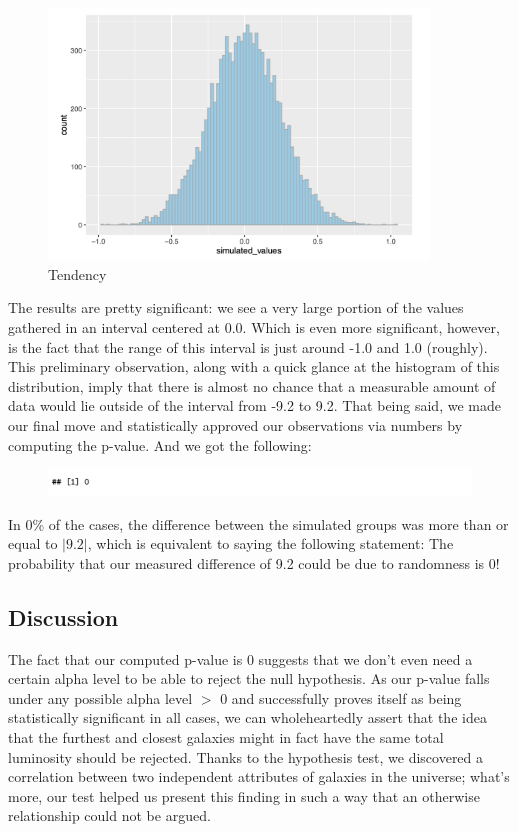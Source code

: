 \documentclass[12pt]{article}
\begin{document}
\begin{figure}[h]
	\centering
	\includegraphics[width=0.9\textwidth]{pic/r2g3.png}
	\caption{Tendency}
\end{figure}
\noindent
The results are pretty significant: we see a very large portion of the values gathered in an interval centered at 0.0. Which is even more significant, however, is the fact that the range of this interval is just around -1.0 and 1.0 (roughly). This preliminary observation, along with a quick glance at the histogram of this distribution, imply that there is almost no chance that a measurable amount of data would lie outside of the interval from -9.2 to 9.2. That being said, we made our final move and statistically approved our observations via numbers by computing the p-value. And we got the following:
\begin{figure}[h]
	\centering
	\includegraphics[width=1.0\textwidth]{pic/r2t5.png}
\end{figure}
\noindent
In 0\% of the cases, the difference between the simulated groups was more than or equal to $|9.2|$, which is equivalent to saying the following statement: The probability that our measured difference of 9.2 could be due to randomness is 0!

\subsection{Discussion}

The fact that our computed p-value is 0 suggests that we don't even need a certain alpha level to be able to reject the null hypothesis. As our p-value falls under any possible alpha level $>$ 0 and successfully proves itself as being statistically significant in all cases, we can wholeheartedly assert that the idea that the furthest and closest galaxies might in fact have the same total luminosity should be rejected. Thanks to the hypothesis test, we discovered a correlation between two independent attributes of galaxies in the universe; what's more, our test helped us present this finding in such a way that an otherwise relationship could not be argued. 
\end{document}
